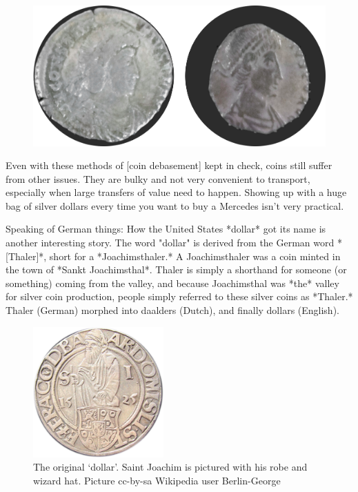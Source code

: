 \begin{figure}
  \includegraphics{assets/images/clipped-coins.png}
  \label{fig:clipped-coins}
\end{figure}

Even with these methods of [coin debasement] kept in check, coins still
suffer from other issues. They are bulky and not very convenient to
transport, especially when large transfers of value need to happen.
Showing up with a huge bag of silver dollars every time you want to buy
a Mercedes isn't very practical.

Speaking of German things: How the United States *dollar* got its name
is another interesting story. The word "dollar" is derived from the
German word *[Thaler]*, short for a *Joachimsthaler.* A Joachimsthaler
was a coin minted in the town of *Sankt Joachimsthal*. Thaler is simply
a shorthand for someone (or something) coming from the valley, and
because Joachimsthal was *the* valley for silver coin production, people
simply referred to these silver coins as *Thaler.* Thaler (German)
morphed into daalders (Dutch), and finally dollars (English).

\begin{figure}
  \centering
  \includegraphics[width=5cm]{assets/images/joachimsthaler.png}
  \caption{The original `dollar'. Saint Joachim is pictured with his robe and wizard hat. Picture cc-by-sa Wikipedia user Berlin-George}
  \label{fig:joachimsthaler}
\end{figure}

